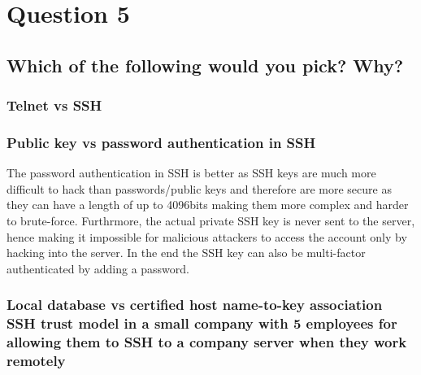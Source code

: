 \documentclass{report}
\begin{document}
	\section{Question 5}
	\startsection
		\renewcommand{\thesubsection}{\thesection.\Alph{subsection}}
		\subsection{Which of the following would you pick? Why?}
		\startsubsection
			\subsubsection{Telnet vs SSH}
			\startsubsection
			\closesection
			\subsubsection{Public key vs password authentication in SSH}
			\startsubsection
				The password authentication in SSH is better as SSH keys are much more difficult to hack than passwords/public keys and therefore are more secure as they can have a length of up to 4096bits making them more complex and harder to brute-force. Furthrmore, the actual private SSH key is never sent to the server, hence making it impossible for malicious attackers to access the account only by hacking into the server. In the end the SSH key can also be multi-factor authenticated by adding a password.
			\closesection
			\subsubsection{Local database vs certified host name-to-key association SSH trust model in a small company with 5 employees for allowing them to SSH to a company server when they work remotely}
			\startsubsection
			\closesection
		\closesection
	\closesection
\end{document}
